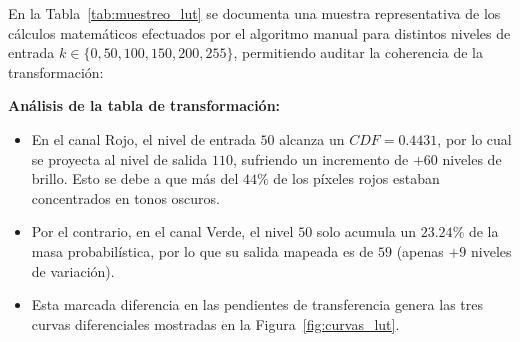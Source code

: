 \documentclass[12pt,a4paper]{article}
\begin{document}
En la Tabla~\ref{tab:muestreo_lut} se documenta una muestra representativa de los cálculos matemáticos efectuados por el algoritmo manual para distintos niveles de entrada $k \in \{0, 50, 100, 150, 200, 255\}$, permitiendo auditar la coherencia de la transformación:

\begin{table}[H]
\centering
\caption{Auditoría matemática de frecuencias, probabilidades acumuladas y valores transformados}
\label{tab:muestreo_lut}
\renewcommand{\arraystretch}{1.2}
\end{table}

\textbf{Análisis de la tabla de transformación:}
\begin{itemize}
    \item En el canal Rojo, el nivel de entrada $50$ alcanza un $CDF = 0.4431$, por lo cual se proyecta al nivel de salida $110$, sufriendo un incremento de $+60$ niveles de brillo. Esto se debe a que más del $44\%$ de los píxeles rojos estaban concentrados en tonos oscuros.
    \item Por el contrario, en el canal Verde, el nivel $50$ solo acumula un $23.24\%$ de la masa probabilística, por lo que su salida mapeada es de $59$ (apenas $+9$ niveles de variación).
    \item Esta marcada diferencia en las pendientes de transferencia genera las tres curvas diferenciales mostradas en la Figura~\ref{fig:curvas_lut}.
\end{itemize}
\end{document}

